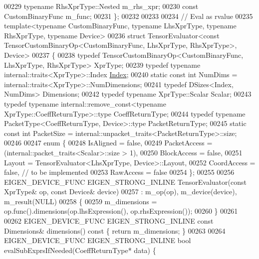 \begin{DoxyCode}
00229     \textcolor{keyword}{typename} RhsXprType::Nested m\_rhs\_xpr;
00230     \textcolor{keyword}{const} CustomBinaryFunc m\_func;
00231 \};
00232 
00233 
00234 \textcolor{comment}{// Eval as rvalue}
00235 \textcolor{keyword}{template}<\textcolor{keyword}{typename} CustomBinaryFunc, \textcolor{keyword}{typename} LhsXprType, \textcolor{keyword}{typename} RhsXprType, \textcolor{keyword}{typename} Device>
00236 \textcolor{keyword}{struct }TensorEvaluator<const TensorCustomBinaryOp<CustomBinaryFunc, LhsXprType, RhsXprType>, Device>
00237 \{
00238   \textcolor{keyword}{typedef} TensorCustomBinaryOp<CustomBinaryFunc, LhsXprType, RhsXprType> XprType;
00239   \textcolor{keyword}{typedef} \textcolor{keyword}{typename} internal::traits<XprType>::Index \hyperlink{namespace_eigen_a62e77e0933482dafde8fe197d9a2cfde}{Index};
00240   \textcolor{keyword}{static} \textcolor{keyword}{const} \textcolor{keywordtype}{int} NumDims = internal::traits<XprType>::NumDimensions;
00241   \textcolor{keyword}{typedef} DSizes<Index, NumDims> Dimensions;
00242   \textcolor{keyword}{typedef} \textcolor{keyword}{typename} XprType::Scalar Scalar;
00243   \textcolor{keyword}{typedef} \textcolor{keyword}{typename} internal::remove\_const<typename XprType::CoeffReturnType>::type CoeffReturnType;
00244   \textcolor{keyword}{typedef} \textcolor{keyword}{typename} PacketType<CoeffReturnType, Device>::type PacketReturnType;
00245   \textcolor{keyword}{static} \textcolor{keyword}{const} \textcolor{keywordtype}{int} PacketSize = internal::unpacket\_traits<PacketReturnType>::size;
00246 
00247   \textcolor{keyword}{enum} \{
00248     IsAligned = \textcolor{keyword}{false},
00249     PacketAccess = (internal::packet\_traits<Scalar>::size > 1),
00250     BlockAccess = \textcolor{keyword}{false},
00251     Layout = TensorEvaluator<LhsXprType, Device>::Layout,
00252     CoordAccess = \textcolor{keyword}{false},  \textcolor{comment}{// to be implemented}
00253     RawAccess = \textcolor{keyword}{false}
00254   \};
00255 
00256   EIGEN\_DEVICE\_FUNC EIGEN\_STRONG\_INLINE TensorEvaluator(\textcolor{keyword}{const} XprType& op, \textcolor{keyword}{const} Device& device)
00257       : m\_op(op), m\_device(device), m\_result(NULL)
00258   \{
00259     m\_dimensions = op.func().dimensions(op.lhsExpression(), op.rhsExpression());
00260   \}
00261 
00262   EIGEN\_DEVICE\_FUNC EIGEN\_STRONG\_INLINE \textcolor{keyword}{const} Dimensions& dimensions()\textcolor{keyword}{ const }\{ \textcolor{keywordflow}{return} m\_dimensions; \}
00263 
00264   EIGEN\_DEVICE\_FUNC EIGEN\_STRONG\_INLINE \textcolor{keywordtype}{bool} evalSubExprsIfNeeded(CoeffReturnType* data) \{

\end{DoxyCode}
